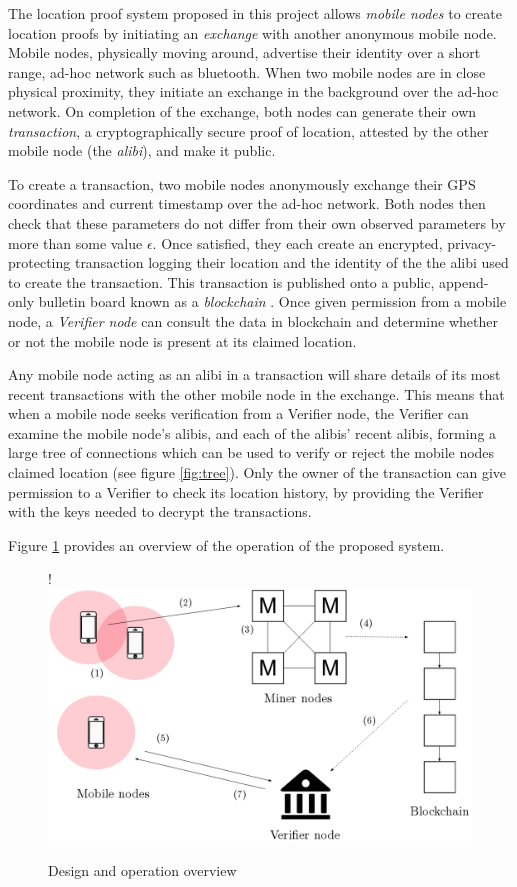 The location proof system proposed in this project allows \textit{mobile nodes} to create location proofs by initiating an \textit{exchange} with another anonymous mobile node. Mobile nodes, physically moving around, advertise their identity over a short range, ad-hoc network such as bluetooth. When two mobile nodes are in close physical proximity, they initiate an exchange in the background over the ad-hoc network. On completion of the exchange, both nodes can generate their own \textit{transaction}, a cryptographically secure proof of location, attested by the other mobile node (the \textit{alibi}), and make it public.

To create a transaction, two mobile nodes anonymously exchange their GPS coordinates and current timestamp over the ad-hoc network. Both nodes then check that these parameters do not differ from their own observed parameters by more than some value $\epsilon$. Once satisfied, they each create an encrypted, privacy-protecting transaction logging their location and the identity of the the alibi used to create the transaction. This transaction is published onto a public, append-only bulletin board known as a \textit{blockchain} \cite{blueprint}. Once given permission from a mobile node, a \textit{Verifier node} can consult the data in blockchain and determine whether or not the mobile node is present at its claimed location.

Any mobile node acting as an alibi in a transaction will share details of its most recent transactions with the other mobile node in the exchange. This means that when a mobile node seeks verification from a Verifier node, the Verifier can examine the mobile node's alibis, and each of the alibis' recent alibis, forming a large tree of connections which can be used to verify or reject the mobile nodes claimed location (see figure \ref{fig:tree}). Only the owner of the transaction can give permission to a Verifier to check its location history, by providing the Verifier with the keys needed to decrypt the transactions.

Figure \ref{fig:overview} provides an overview of the operation of the proposed system.

\begin{figure}[H]
\begin{center}
\resizebox {\columnwidth} {!} {\includegraphics{diagrams/overview.png}}
\caption{Design and operation overview}
\label{fig:overview}
\end{center}
\end{figure}

